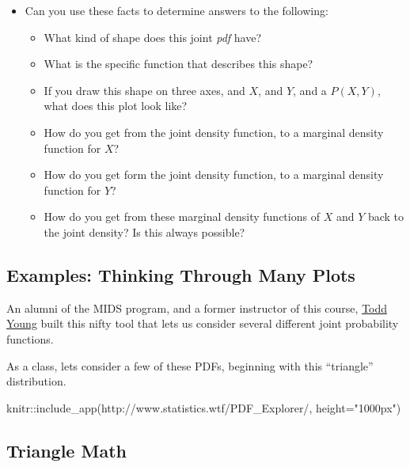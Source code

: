 \documentclass[
]{book}
\newenvironment{Shaded}{\begin{snugshade}}{\end{snugshade}}
\newcommand{\AttributeTok}[1]{\textcolor[rgb]{0.77,0.63,0.00}{#1}}
\newcommand{\FunctionTok}[1]{\textcolor[rgb]{0.00,0.00,0.00}{#1}}
\newcommand{\NormalTok}[1]{#1}
\newcommand{\SpecialCharTok}[1]{\textcolor[rgb]{0.00,0.00,0.00}{#1}}
\newcommand{\StringTok}[1]{\textcolor[rgb]{0.31,0.60,0.02}{#1}}
\providecommand{\tightlist}{%
  \setlength{\itemsep}{0pt}\setlength{\parskip}{0pt}}
\theoremstyle{definition}
\theoremstyle{definition}
\theoremstyle{definition}
\theoremstyle{definition}
\theoremstyle{remark}
\begin{document}
\begin{itemize}
\tightlist
\item
  Can you use these facts to determine answers to the following:

  \begin{itemize}
  \tightlist
  \item
    What kind of shape does this joint \emph{pdf} have?
  \item
    What is the specific function that describes this shape?
  \item
    If you draw this shape on three axes, and \(X\), and \(Y\), and a \(P(X,Y)\), what does this plot look like?
  \item
    How do you get from the joint density function, to a marginal density function for \(X\)?
  \item
    How do you get form the joint density function, to a marginal density function for \(Y\)?
  \item
    How do you get from these marginal density functions of \(X\) and \(Y\) back to the joint density? Is this always possible?
  \end{itemize}
\end{itemize}

\hypertarget{examples-thinking-through-many-plots}{%
\subsection{Examples: Thinking Through Many Plots}\label{examples-thinking-through-many-plots}}

An alumni of the MIDS program, and a former instructor of this course, \href{https://www.linkedin.com/in/dtoddyoung/}{Todd Young} built this nifty tool that lets us consider several different joint probability functions.

As a class, lets consider a few of these PDFs, beginning with this ``triangle'' distribution.

\begin{Shaded}
\begin{Highlighting}[]
\NormalTok{knitr}\SpecialCharTok{::}\FunctionTok{include\_app}\NormalTok{(}\StringTok{\textquotesingle{}http://www.statistics.wtf/PDF\_Explorer/\textquotesingle{}}\NormalTok{, }\AttributeTok{height=}\StringTok{"1000px"}\NormalTok{)}
\end{Highlighting}
\end{Shaded}

\hypertarget{triangle-math}{%
\subsection{Triangle Math}\label{triangle-math}}
\end{document}
